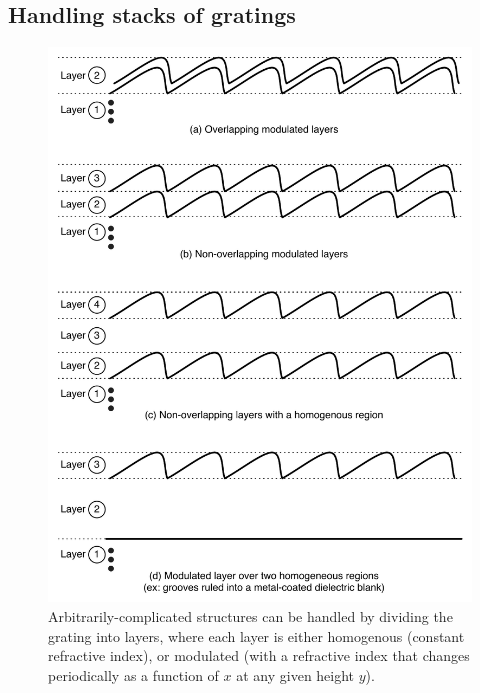 \subsection{Handling stacks of gratings}
\label{stacksOfGratings}
\begin{figure}[htbp] %
   \centering
   \includegraphics[scale=0.8]{../data/Chapter2/2d_stacksOfGratings/2d_1.pdf} 
   \caption{Arbitrarily-complicated structures can be handled by dividing the grating into layers, where each layer is either homogenous (constant refractive index), or modulated (with a refractive index that changes periodically as a function of $x$ at any given height $y$).}
   \label{2d-1}
\end{figure}


